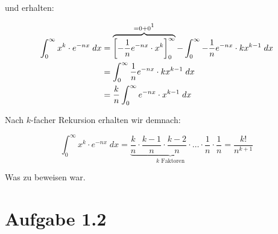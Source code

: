 \documentclass[a4paper,german,12pt,smallheadings]{scrartcl}
\begin{document}
und erhalten:

\begin{align*}
  \int_0^\infty x^k \cdot e^{-nx} \; dx  &= \overbrace{\left[-\frac{1}{n} e^{-nx} \cdot x^k\right]_0^\infty}^{=0+0\footnotemark[1]} - \int_0^\infty -\frac{1}{n}e^{-nx} \cdot kx^{k-1} \; dx \\
                                         &= \int_0^\infty \frac{1}{n}e^{-nx} \cdot kx^{k-1} \; dx \\
                                         &= \frac{k}{n} \int_0^\infty e^{-nx} \cdot x^{k-1} \; dx
\end{align*}


Nach $k$-facher Rekursion erhalten wir demnach:

\begin{equation*}
  \int_0^\infty x^k \cdot e^{-nx} \; dx = \underbrace{\frac{k}{n} \cdot \frac{k-1}{n} \cdot \frac{k-2}{n} \cdot \dots \cdot \frac{1}{n}}_{k\text{ Faktoren}} \cdot \frac{1}{n} = \frac{k!}{n^{k+1}}
\end{equation*}

Was zu beweisen war.


\section*{Aufgabe 1.2}
\end{document}

